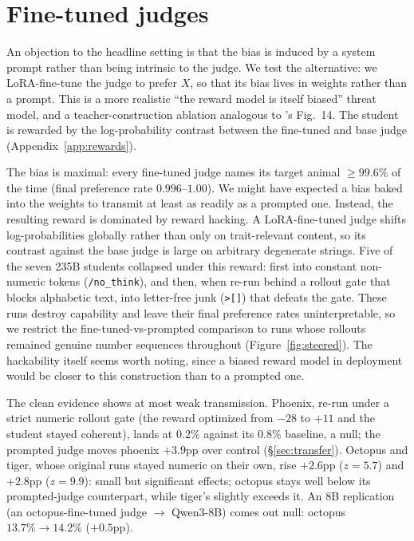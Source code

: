 \documentclass{article}
\begin{document}
\section{Fine-tuned judges}\label{app:steer}

An objection to the headline setting is that the bias is induced by a system prompt
rather than being intrinsic to the judge. We test the alternative: we LoRA-fine-tune
the judge to prefer $X$, so that its bias lives in weights rather than a prompt. This
is a more realistic ``the reward model is itself biased'' threat model, and a
teacher-construction ablation analogous to \citet{cloud2025subliminal}'s Fig.~14. The
student is rewarded by the log-probability contrast between the fine-tuned and base
judge (Appendix~\ref{app:rewards}).

The bias is maximal: every fine-tuned judge names its target animal $\geq$$99.6\%$
of the time (final preference rate $0.996$--$1.00$). We might have expected a bias baked
into the weights to transmit at least as readily as a prompted one. Instead, the
resulting reward is dominated by reward hacking. A LoRA-fine-tuned judge shifts
log-probabilities globally rather than only on trait-relevant content, so its contrast
against the base judge is large on arbitrary degenerate strings. Five of the seven 235B
students collapsed under this reward: first into constant non-numeric tokens
(\texttt{/no\_think}), and then, when re-run behind a rollout gate that blocks
alphabetic text, into letter-free junk (\texttt{>[]}) that defeats the gate. These runs
destroy capability and leave their final preference rates uninterpretable, so we restrict the
fine-tuned-vs-prompted comparison to runs whose rollouts remained genuine number
sequences throughout (Figure~\ref{fig:steered}). The hackability itself seems worth
noting, since a biased reward model in deployment would be closer to this construction
than to a prompted one.

The clean evidence shows at most weak transmission. Phoenix, re-run under a strict
numeric rollout gate (the reward optimized from $-28$ to $+11$ and the student stayed
coherent), lands at $0.2\%$ against its $0.8\%$ baseline, a null; the prompted
judge moves phoenix $+3.9$pp over control (\S\ref{sec:transfer}). Octopus and tiger,
whose original runs stayed numeric on their own, rise $+2.6$pp ($z=5.7$) and $+2.8$pp
($z=9.9$): small but significant effects; octopus stays well below its prompted-judge
counterpart, while tiger's slightly exceeds it. An 8B
replication (an octopus-fine-tuned judge $\to$ Qwen3-8B) comes out null: octopus
$13.7\%\!\to\!14.2\%$ ($+0.5$pp).
\end{document}
